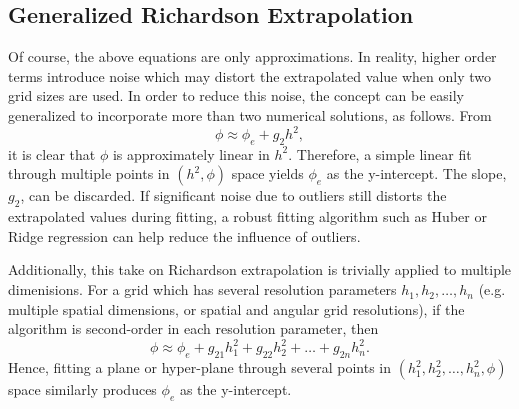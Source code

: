 \subsection{Generalized Richardson Extrapolation}
Of course, the above equations are only approximations.
In reality, higher order terms introduce noise which may distort the extrapolated value
when only two grid sizes are used.
In order to reduce this noise, the concept can be easily generalized to incorporate more than two numerical solutions, as follows.
From
\begin{equation*}
  \phi \approx \phi_e + g_2 h^2,
\end{equation*}
it is clear that $\phi$ is approximately linear in $h^2$.
Therefore, a simple linear fit through multiple points in $(h^2, \phi)$ space yields $\phi_e$ as the y-intercept.
The slope, $g_2$, can be discarded.
If significant noise due to outliers still distorts the extrapolated values during fitting, a robust fitting algorithm such as Huber \cite{yu_robust_2014} or Ridge \cite{hoerl_ridge_1970} regression can help reduce the influence of outliers.

Additionally, this take on Richardson extrapolation is trivially applied to multiple dimenisions.
For a grid which has several resolution parameters $h_1, h_2, \ldots, h_n$ (e.g. multiple spatial dimensions, or spatial and angular grid resolutions), if the algorithm is second-order in each resolution parameter, then
\begin{equation*}
  \phi \approx \phi_e + g_{21} h_1^2 + g_{22} h_2^2 + \ldots + g_{2n} h_n^2.
\end{equation*}
Hence, fitting a plane or hyper-plane through several points in $(h_1^2, h_2^2, \ldots, h_n^2, \phi)$ space similarly produces $\phi_e$ as the y-intercept.

